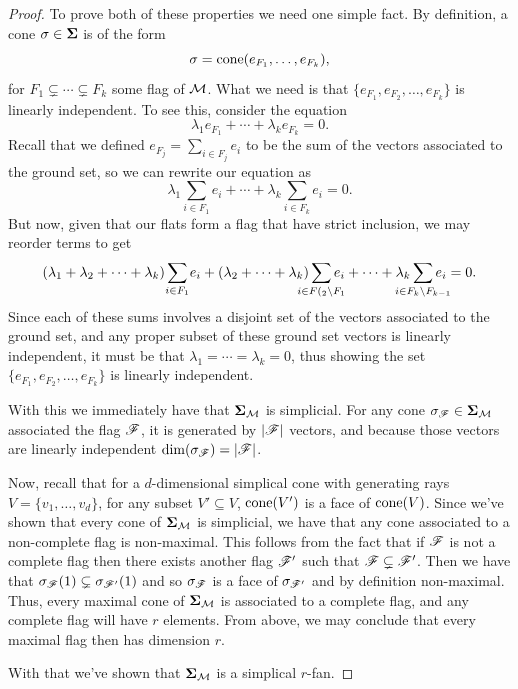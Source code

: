 \documentclass[12pt,oneside]{../../sfsuthesis}
\begin{document}
\begin{proof}
    To prove both of these properties we need one simple fact.
    By definition, a cone \( \sigma \in \bm{\Sigma} \) is of the form
    \[
        \sigma = \mathrm{cone}( e_{F_1}, \dots, e_{F_k} ),
    \]
    for \( F_1 \subsetneq \cdots \subsetneq F_k \) some flag of \( \mathcal{M} \).
    What we need is that \( \{e_{F_1}, e_{F_2}, \dots, e_{F_k} \} \) is linearly independent.
    To see this, consider the equation
    \[
        \lambda_{1}e_{F_1} + \cdots + \lambda_{k}e_{F_{k}} = 0.
    \]
    Recall that we defined \( e_{F_j} = \sum_{i \in F_{j} } e_i \) to be the sum of the vectors associated to the ground set, so we can rewrite our equation as
    \[
        \lambda_{1}\sum_{i \in F_{1} } e_i + \cdots + \lambda_{k}\sum_{i \in F_{k} } e_i = 0.
    \]
    But now, given that our flats form a flag that have strict inclusion, we may reorder terms to get
    \[
        (\lambda_1 + \lambda_2 + \cdots + \lambda_k) \sum_{\mathclap{i \in F_1}} e_i
        + (\lambda_2 + \cdots + \lambda_k) \sum_{\mathclap{i \in F(_2 \setminus F_1}} e_i
        + \cdots
        + \lambda_k \sum_{\mathclap{i \in F_k \setminus F_{k-1}}} e_i  = 0.
    \]
    Since each of these sums involves a disjoint set of the vectors associated to the ground set, and any proper subset of these ground set vectors is linearly independent, it must be that \( \lambda_1 = \cdots = \lambda_k = 0 \), thus showing the set \( \{e_{F_1}, e_{F_2}, \dots, e_{F_k} \} \) is linearly independent.

    With this we immediately have that \( \bm{\Sigma}_{\mathcal{M}} \) is simplicial.
    For any cone \( \sigma_{\mathscr{F}} \in \bm{\Sigma}_{\mathcal{M}} \) associated the flag \( \mathscr{F} \), it is generated by \( |\mathscr{F}| \) vectors, and because those vectors are linearly independent \( \dim(\sigma_{\mathscr{F}}) = |\mathscr{F}| \).

    Now, recall that for a \( d \)-dimensional simplical cone with generating rays \(  V = \{ v_1, \dots, v_d \} \), for any subset \( V' \subseteq V \),
    \( \mathrm{cone}(V') \) is a face of \( \mathrm{cone}(V) \).
    Since we've  shown that every cone of \( \bm{\Sigma}_{\mathcal{M}} \) is simplicial, we have that any cone associated to a non-complete flag is non-maximal.
    This follows from the fact that if \( \mathscr{F} \) is not a complete flag then there exists another flag \( \mathscr{F}' \) such that \( \mathscr{F} \subsetneq \mathscr{F}' \).
    Then we have that \( \sigma_{\mathscr{F}}(1) \subsetneq \sigma_{\mathscr{F}'}(1) \) and so \( \sigma_{\mathscr{F}} \) is a face of \( \sigma_{\mathscr{F}'} \) and by definition non-maximal.
    Thus, every maximal cone of \( \bm{\Sigma}_{\mathcal{M}} \) is associated to a complete flag, and any complete flag will have \( r \) elements.
    From above, we may conclude that every maximal flag then has dimension \( r \).

    With that we've shown that \( \bm{\Sigma}_{\mathcal{M}} \) is a simplical \( r \)-fan.

\end{proof}
\end{document}
